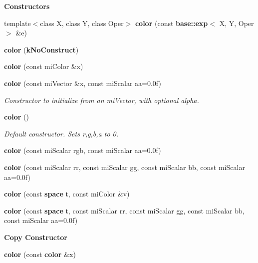 \begin{Indent}{\bf Constructors}\par
\begin{CompactItemize}
\item 
template$<$class X, class Y, class Oper$>$ {\bf color} (const {\bf base::exp}$<$ X, Y, Oper $>$ \&e)
\item 
{\bf color} ({\bf k\-No\-Construct})
\item 
{\bf color} (const mi\-Color \&x)
\item 
{\bf color} (const mi\-Vector \&x, const mi\-Scalar aa=0.0f)
\begin{CompactList}\small\item\em Constructor to initialize from an mi\-Vector, with optional alpha. \item\end{CompactList}\item 
{\bf color} ()
\begin{CompactList}\small\item\em Default constructor. Sets r,g,b,a to 0. \item\end{CompactList}\item 
{\bf color} (const mi\-Scalar rgb, const mi\-Scalar aa=0.0f)
\item 
{\bf color} (const mi\-Scalar rr, const mi\-Scalar gg, const mi\-Scalar bb, const mi\-Scalar aa=0.0f)
\item 
{\bf color} (const {\bf space} t, const mi\-Color \&v)
\item 
{\bf color} (const {\bf space} t, const mi\-Scalar rr, const mi\-Scalar gg, const mi\-Scalar bb, const mi\-Scalar aa=0.0f)
\end{CompactItemize}
\end{Indent}
\begin{Indent}{\bf Copy Constructor}\par
\begin{CompactItemize}
\item 
{\bf color} (const {\bf color} \&x)
\end{CompactItemize}
\end{Indent}
